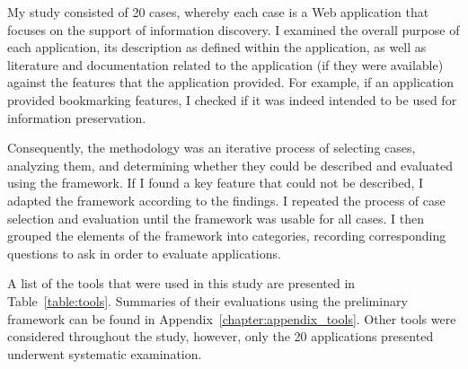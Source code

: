 {My study consisted of 20 cases, whereby each case is a Web application that focuses on the support of information discovery. I examined the overall purpose of each application, its description as defined within the application, as well as literature and documentation related to the application (if they were available) against the features that the application provided. For example, if an application provided bookmarking features, I checked if it was indeed intended to be used for information preservation. 

Consequently, the methodology was an iterative process of selecting cases, analyzing them, and determining whether they could be described and evaluated using the framework. If I found a key feature that could not be described, I adapted the framework according to the findings. I repeated the process of case selection and evaluation until the framework was usable for all cases. I then grouped the elements of the framework into categories, recording corresponding questions to ask in order to evaluate applications. 

A list of the tools that were used in this study are presented in Table~\ref{table:tools}. Summaries of their evaluations using the preliminary framework can be found in Appendix~\ref{chapter:appendix_tools}. Other tools were considered throughout the study, however, only the 20 applications presented underwent systematic examination. 

\begin{table*}[htbp]
\small
\label{table:tools}
\caption{Web-based Information Discovery and Curation Tools as of May 15, 2014}

\begin{tabular}{|p{0.20\linewidth}| p{0.30\linewidth}| p{0.45\linewidth}|}


\end{tabular}
\end{table*}}
